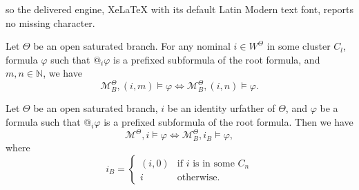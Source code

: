 \documentclass[10pt,a4paper]{amsart}
\newcommand{\Kmodel}{\mathcal{M}}
\begin{document}
so the delivered engine, XeLaTeX with its default Latin Modern text font, reports no missing character.
\begin{lemma}
    Let $\Theta$ be an open saturated branch. For any nominal $i \in W^\Theta$ in some cluster $C_l$, formula $\varphi$ such that $@_i \varphi$ is a prefixed subformula of the root formula, and $m, n \in \mathbb{N}$, we have
    \[
        \Kmodel^\Theta_B, (i, m) \models \varphi \iff \Kmodel^\Theta_B, (i, n) \models \varphi.
    \]
    \label{lemclusterequiv}
\end{lemma}

\begin{lemma}
    Let $\Theta$ be an open saturated branch, $i$ be an identity urfather of $\Theta$, and $\varphi$ be a formula such that $@_i \varphi$ is a prefixed subformula of the root formula. Then we have
    \[
        \Kmodel^\Theta, i \models \varphi \iff \Kmodel^\Theta_B, i_B \models \varphi ,
    \]
    where
    \[
        i_B = 
        \begin{cases}
            (i, 0) &\text{if } i \text{ is in some } C_n \\
            i &\text{otherwise}.
        \end{cases}
    \]
    \label{lembulldozingpreserve}
\end{lemma}
\end{document}
